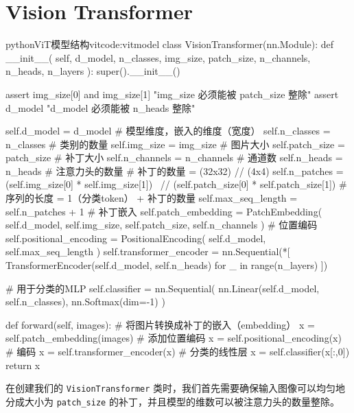 \documentclass[lang=cn,newtx,10pt,scheme=chinese]{elegantbook}
\newcommand{\py}[1]{%
  \colorbox{gray!10}{\texttt{#1}}%
}
\begin{document}
\section{Vision Transformer}

\begin{codebox}{python}{ViT模型结构}{vitcode:vitmodel}
class VisionTransformer(nn.Module):
    def __init__(
        self,
        d_model,
        n_classes,
        img_size,
        patch_size,
        n_channels,
        n_heads,
        n_layers
    ):
        super().__init__()

        assert img_size[0] %
           and img_size[1] %
           "img_size 必须能被 patch_size 整除"
        assert d_model %
           "d_model 必须能被 n_heads 整除"

        self.d_model = d_model # 模型维度，嵌入的维度（宽度）
        self.n_classes = n_classes # 类别的数量
        self.img_size = img_size # 图片大小
        self.patch_size = patch_size # 补丁大小
        self.n_channels = n_channels # 通道数
        self.n_heads = n_heads # 注意力头的数量
        # 补丁的数量 = (32x32) // (4x4)
        self.n_patches = (self.img_size[0] * self.img_size[1]) \
                      // (self.patch_size[0] * self.patch_size[1])
        # 序列的长度 = 1（分类token） + 补丁的数量
        self.max_seq_length = self.n_patches + 1
        # 补丁嵌入
        self.patch_embedding = PatchEmbedding(
            self.d_model,
            self.img_size,
            self.patch_size,
            self.n_channels
        )
        # 位置编码
        self.positional_encoding = PositionalEncoding(
            self.d_model,
            self.max_seq_length
        )
        self.transformer_encoder = nn.Sequential(*[
            TransformerEncoder(self.d_model, self.n_heads)
            for _ in range(n_layers)
        ])

        # 用于分类的MLP
        self.classifier = nn.Sequential(
            nn.Linear(self.d_model, self.n_classes),
            nn.Softmax(dim=-1)
        )

    def forward(self, images):
        # 将图片转换成补丁的嵌入（embedding）
        x = self.patch_embedding(images)
        # 添加位置编码
        x = self.positional_encoding(x)
        # 编码
        x = self.transformer_encoder(x)
        # 分类的线性层
        x = self.classifier(x[:,0])
        return x
\end{codebox}

在创建我们的 \py{VisionTransformer} 类时，我们首先需要确保输入图像可以均匀地分成大小为 \py{patch_size} 的补丁，并且模型的维数可以被注意力头的数量整除。
\end{document}
